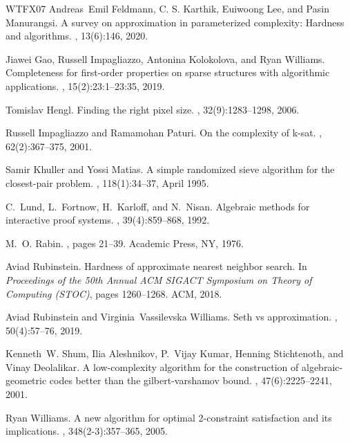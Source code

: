 \documentclass[11pt]{article}
\theoremstyle{plain}
\theoremstyle{remark}
\begin{document}
\begin{thebibliography}{WTFX07}
Andreas~Emil Feldmann, {C. S.} Karthik, Euiwoong Lee, and Pasin Manurangsi.
\newblock A survey on approximation in parameterized complexity: Hardness and
  algorithms.
, 13(6):146, 2020.

Jiawei Gao, Russell Impagliazzo, Antonina Kolokolova, and Ryan Williams.
\newblock Completeness for first-order properties on sparse structures with
  algorithmic applications.
, 15(2):23:1--23:35, 2019.

Tomislav Hengl.
\newblock Finding the right pixel size.
, 32(9):1283--1298, 2006.

Russell Impagliazzo and Ramamohan Paturi.
\newblock On the complexity of k-sat.
, 62(2):367--375, 2001.

Samir Khuller and Yossi Matias.
\newblock A simple randomized sieve algorithm for the closest-pair problem.
, 118(1):34--37, April 1995.

C.~Lund, L.~Fortnow, H.~Karloff, and N.~Nisan.
\newblock Algebraic methods for interactive proof systems.
, 39(4):859--868, 1992.

M.~O. Rabin.
, pages 21--39.
\newblock Academic Press, NY, 1976.

Aviad Rubinstein.
\newblock Hardness of approximate nearest neighbor search.
\newblock In {\em Proceedings of the 50th Annual ACM SIGACT Symposium on Theory
  of Computing (STOC)}, pages 1260--1268. ACM, 2018.

Aviad Rubinstein and Virginia~Vassilevska Williams.
\newblock Seth vs approximation.
, 50(4):57--76, 2019.

Kenneth~W. Shum, Ilia Aleshnikov, P.~Vijay Kumar, Henning Stichtenoth, and
  Vinay Deolalikar.
\newblock A low-complexity algorithm for the construction of
  algebraic-geometric codes better than the gilbert-varshamov bound.
, 47(6):2225--2241,
  2001.

Ryan Williams.
\newblock A new algorithm for optimal 2-constraint satisfaction and its
  implications.
, 348(2-3):357--365, 2005.


\end{thebibliography}
\end{document}
